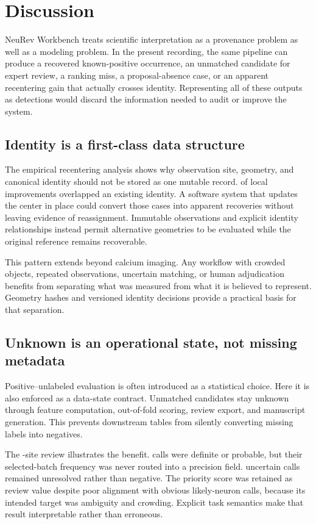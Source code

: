 \section{Discussion}

NeuRev Workbench treats scientific interpretation as a provenance problem as
well as a modeling problem. In the present recording, the same pipeline can
produce a recovered known-positive occurrence, an unmatched candidate for expert
review, a ranking miss, a proposal-absence case, or an apparent recentering gain
that actually crosses identity. Representing all of these outputs as detections
would discard the information needed to audit or improve the system.

\subsection{Identity is a first-class data structure}

The empirical recentering analysis shows why observation site, geometry, and
canonical identity should not be stored as one mutable record.
\VenueIdentityCollision{} of \VenueStrictMissed{} local improvements overlapped
an existing identity. A software system that updates the
center in place could convert those cases into apparent recoveries without
leaving evidence of reassignment. Immutable observations and explicit identity
relationships instead permit alternative geometries to be evaluated while the
original reference remains recoverable.

This pattern extends beyond calcium imaging. Any workflow with crowded objects,
repeated observations, uncertain matching, or human adjudication benefits from
separating what was measured from what it is believed to represent. Geometry
hashes and versioned identity decisions provide a practical basis for that
separation.

\subsection{Unknown is an operational state, not missing metadata}

Positive--unlabeled evaluation is often introduced as a statistical choice. Here
it is also enforced as a data-state contract. Unmatched candidates stay unknown
through feature computation, out-of-fold scoring, review export, and manuscript
generation. This prevents downstream tables from silently converting missing
labels into negatives.

The \VenueReviewedCandidates{}-site review illustrates the benefit.
\VenueReviewLikely{} calls were definite or probable, but their selected-batch
frequency was never routed into a precision field. \VenueReviewUncertain{}
uncertain calls remained unresolved rather than negative. The
priority score was retained as review value despite poor alignment with obvious
likely-neuron calls, because its intended target was ambiguity and crowding.
Explicit task semantics make that result interpretable rather than erroneous.


